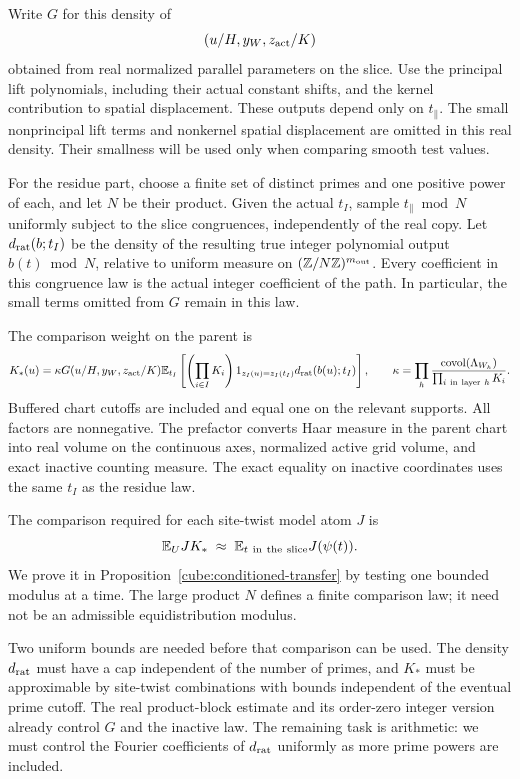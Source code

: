 Write $G$ for this density of
\[
             (u/H,y_W,z_{\rm act}/K)
\]
obtained from real normalized parallel parameters on the slice.
Use the principal lift polynomials, including their actual
constant shifts, and the kernel contribution to spatial
displacement. These outputs depend only on $t_\parallel$.
The small nonprincipal lift terms and nonkernel spatial
displacement are omitted in this real density. Their smallness
will be used only when comparing smooth test values.

For the residue part, choose a finite set of distinct primes
and one positive power of each, and let $N$ be their product.
Given the actual $t_I$,
sample $t_\parallel\bmod N$ uniformly subject to the slice
congruences, independently of the real copy. Let
$d_{\rm rat}(b;t_I)$ be the density of the resulting true
integer polynomial output $b(t)\bmod N$, relative to uniform
measure on $(\mathbb Z/N\mathbb Z)^{m_{\rm out}}$. Every coefficient in
this congruence law is the actual integer coefficient of the
path. In particular, the small terms omitted from $G$ remain
in this law.

The comparison weight on the parent is
\begin{equation}
 K_*(u)=\kappa G(u/H,y_W,z_{\rm act}/K)
 \mathbb E_{t_I}\left[
   \left(\prod_{i\in I}K_i\right)
   1_{z_I(u)=z_I(t_I)}d_{\rm rat}(b(u);t_I)\right],
 \qquad
 \kappa=\prod_h
 \frac{\operatorname{covol}(\Lambda_{W_h})}
      {\prod_{i\ {\rm in\ layer}\ h}K_i}.
 \label{cube:forecast}
\end{equation}
Buffered chart cutoffs are included and equal one on the relevant
supports. All factors are nonnegative. The prefactor converts
Haar measure in the parent chart into real volume on the
continuous axes, normalized active grid volume, and exact
inactive counting measure. The exact equality on inactive
coordinates uses the same $t_I$ as the residue law.

The comparison required for each site-twist model atom $J$ is
\[
             \mathbb E_U J K_*\;\approx\;
                  \mathbb E_{t\ {\rm in\ the\ slice}}J(\psi(t)).
\]
We prove it in Proposition~\ref{cube:conditioned-transfer} by
testing one bounded modulus at a time. The large product $N$
defines a finite comparison law; it need not be an admissible
equidistribution modulus.

Two uniform bounds are needed before that comparison can be
used. The density $d_{\rm rat}$ must have a cap independent of
the number of primes, and $K_*$ must be approximable by
site-twist combinations with bounds independent of the eventual
prime cutoff. The real product-block estimate and its order-zero
integer version already control $G$ and the inactive law. The
remaining task is arithmetic: we must control the Fourier
coefficients of $d_{\rm rat}$ uniformly as more prime powers
are included.

